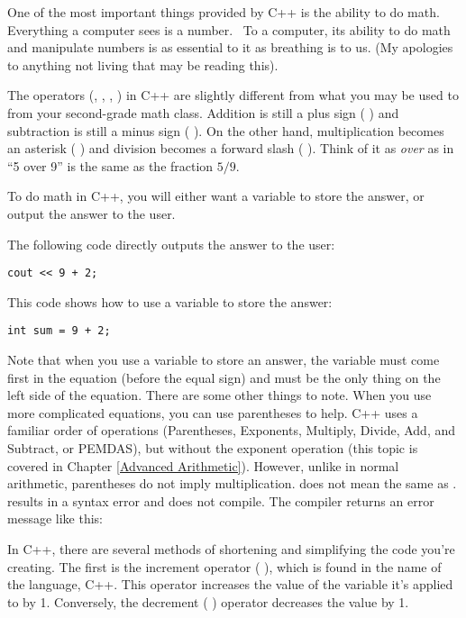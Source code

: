 
One of the most important things provided by C++ is the ability to do math. 
Everything a computer sees is a number. \
To a computer, its ability to do math and manipulate numbers is as essential to it as breathing is to us. 
(My apologies to anything not living that may be reading this).

The operators (\Code{+}, \Code{-}, \Code{*}, \Code{/}) in C++ are slightly different from what you may be used to from your second-grade math class. 
Addition is still a plus sign ( \Code{+} ) and subtraction is still a minus sign ( \Code{-} ). 
On the other hand, multiplication becomes an asterisk ( \Code{*} ) and division becomes a forward slash ( \Code{/} ). 
Think of it as \textit{over} as in ``5 over 9'' is the same as the fraction $5/9$.

To do math in C++, you will either want a variable to store the answer, or output the answer to the user. 

The following code directly outputs the answer to the user:

\begin{lstlisting}
cout << 9 + 2;
\end{lstlisting}

This code shows how to use a variable to store the answer:

\begin{lstlisting}
int sum = 9 + 2;
\end{lstlisting}

Note that when you use a variable to store an answer, the variable must come first in the equation (before the equal sign) and must be the only thing on the left side of the equation. 
There are some other things to note.
When you use more complicated equations, you can use parentheses to help. 
C++ uses a familiar order of operations (Parentheses, Exponents, Multiply, Divide, Add, and Subtract, or PEMDAS), but without the exponent operation (this topic is covered in Chapter \ref{Advanced Arithmetic}). 
However, unlike in normal arithmetic, parentheses do not imply multiplication. 
 does not mean the same as \Code{4~*~3}. 
\Code{(4)(3)} results in a syntax error and does not compile. 
The compiler returns an error message like this: 

In C++, there are several methods of shortening and simplifying the code you're creating. 
The first is the increment operator ( \Code{++} ), which is found in the name of the language, C++.
This operator increases the value of the variable it's applied to by 1. 
Conversely, the decrement ( \Code{--} ) operator decreases the value by 1.


